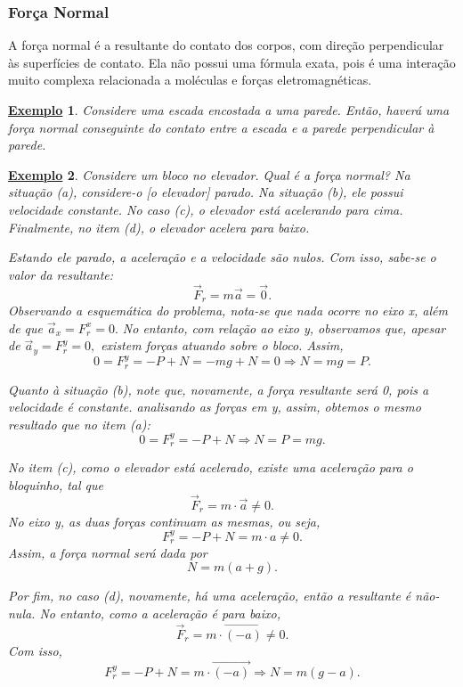 \documentclass{article}
\newtheorem{example}{\underline{Exemplo}}
\begin{document}
  \subsubsection{For\c ca Normal}
    A for\c ca normal \'e a resultante do contato dos corpos, com dire\c c\~ao perpendicular \`as superf\'icies de contato. Ela n\~ao
    possui uma f\'ormula exata, pois \'e uma intera\c c\~ao muito complexa relacionada a mol\'eculas e for\c cas eletromagn\'eticas.
   \begin{example}
     Considere uma escada encostada a uma parede. Ent\~ao, haver\'a uma for\c ca normal conseguinte do contato entre a escada
     e a parede perpendicular \`a parede.
     \begin{center}
    \end{center}
   \end{example}
  \begin{example}
    Considere um bloco no elevador. Qual \'e a for\c ca normal? Na situa\c c\~ao (a), considere-o [o elevador] parado. Na
    situa\c c\~ao (b), ele possui velocidade constante. No caso (c), o elevador est\'a acelerando para cima. Finalmente,
    no item (d), o elevador acelera para baixo.

    Estando ele parado, a acelera\c c\~ao e a velocidade s\~ao nulos. Com isso, sabe-se o valor da resultante: 
      $$
        \vec{F}_{r} = m \vec{a} = \vec{0}.
      $$
    Observando a esquem\'atica do problema, nota-se que nada ocorre no eixo x, al\'em de que $\vec{a}_{x} = F_{r}^{x} = 0.$
    No entanto, com rela\c c\~ao ao eixo y, observamos que, apesar de $\vec{a}_{y} = F_{r}^{y} = 0,$ existem for\c cas atuando
    sobre o bloco. Assim, 
      $$
        0 = F_{r}^{y} = -P + N = -mg + N = 0 \Rightarrow N = mg = P.
      $$

    Quanto \`a situa\c c\~ao (b), note que, novamente, a for\c ca resultante ser\'a 0, pois a velocidade \'e constante.
    analisando as for\c cas em y, assim, obtemos o mesmo resultado que no item (a): 
      $$
        0 = F_{r}^{y} = -P + N \Rightarrow N = P = mg.
      $$

    No item (c), como o elevador est\'a acelerado, existe uma acelera\c c\~ao para o bloquinho, tal que 
      $$
        \vec{F}_{r} = m \cdot \vec{a} \neq 0.
      $$
    No eixo y, as duas for\c cas continuam as mesmas, ou seja, 
      $$
        F_{r}^{y} = -P + N = m \cdot a\neq 0.
      $$
    Assim, a for\c ca normal ser\'a dada por 
      $$
        N = m(a + g).
      $$

    Por fim, no caso (d), novamente, h\'a uma acelera\c c\~ao, ent\~ao a resultante \'e n\~ao-nula. No entanto, como a acelera\c c\~ao \'e para baixo, 
      $$
        \vec{F}_{r} = m \cdot \vec{(-a)}\neq 0.
      $$
      Com isso, 
        $$
          F_{r}^{y} = -P + N = m \cdot \vec{(-a)} \Rightarrow N = m(g - a).
        $$
  \end{example}
\end{document}
